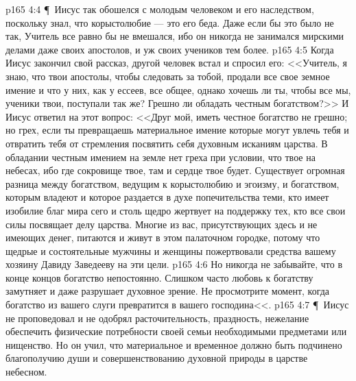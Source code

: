 \vs p165 4:4 \P\ Иисус так обошелся с молодым человеком и его наследством, поскольку знал, что корыстолюбие --- это его беда. Даже если бы это было не так, Учитель все равно бы не вмешался, ибо он никогда не занимался мирскими делами даже своих апостолов, и уж своих учеников тем более.
\vs p165 4:5 Когда Иисус закончил свой рассказ, другой человек встал и спросил его: <<Учитель, я знаю, что твои апостолы, чтобы следовать за тобой, продали все свое земное имение и что у них, как у ессеев, все общее, однако хочешь ли ты, чтобы все мы, ученики твои, поступали так же? Грешно ли обладать честным богатством?>> И Иисус ответил на этот вопрос: <<Друг мой, иметь честное богатство не грешно; но грех, если ты превращаешь материальное имение  которые могут увлечь тебя и отвратить тебя от стремления посвятить себя духовным исканиям царства. В обладании честным имением на земле нет греха при условии, что  твое на небесах, ибо где сокровище твое, там и сердце твое будет. Существует огромная разница между богатством, ведущим к корыстолюбию и эгоизму, и богатством, которым владеют и которое раздается в духе попечительства теми, кто имеет изобилие благ мира сего и столь щедро жертвует на поддержку тех, кто все свои силы посвящает делу царства. Многие из вас, присутствующих здесь и не имеющих денег, питаются и живут в этом палаточном городке, потому что щедрые и состоятельные мужчины и женщины пожертвовали средства вашему хозяину Давиду Заведееву на эти цели.
\vs p165 4:6 Но никогда не забывайте, что в конце концов богатство непостоянно. Слишком часто любовь к богатству замутняет и даже разрушает духовное зрение. Не просмотрите момент, когда богатство из вашего слуги превратится в вашего господина<<.
\vs p165 4:7 \P\ Иисус не проповедовал и не одобрял расточительность, праздность, нежелание обеспечить физические потребности своей семьи необходимыми предметами или нищенство. Но он учил, что материальное и временное должно быть подчинено благополучию души и совершенствованию духовной природы в царстве небесном.
